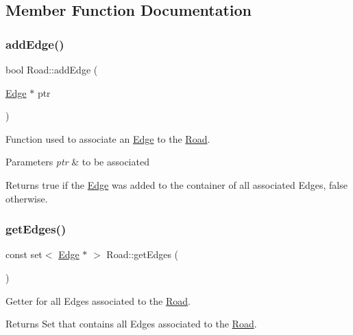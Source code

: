 \subsection{Member Function Documentation}
\hypertarget{class_road_a7a691f98e8bd53299ed2539de1e4d13c}{}\label{class_road_a7a691f98e8bd53299ed2539de1e4d13c} 
\subsubsection{\texorpdfstring{add\+Edge()}{addEdge()}}
{\footnotesize\ttfamily bool Road\+::add\+Edge (\begin{DoxyParamCaption}\item[{\hyperlink{class_edge}{Edge} $\ast$}]{ptr }\end{DoxyParamCaption})}

Function used to associate an \hyperlink{class_edge}{Edge} to the \hyperlink{class_road}{Road}.


\begin{DoxyParams}{Parameters}
{\em ptr} & to be associated\\
\hline
\end{DoxyParams}
\begin{DoxyReturn}{Returns}
true if the \hyperlink{class_edge}{Edge} was added to the container of all associated Edges, false otherwise. 
\end{DoxyReturn}
\hypertarget{class_road_a03fb1c0a74b860e4be6c951154add098}{}\label{class_road_a03fb1c0a74b860e4be6c951154add098} 
\subsubsection{\texorpdfstring{get\+Edges()}{getEdges()}}
{\footnotesize\ttfamily const set$<$ \hyperlink{class_edge}{Edge} $\ast$ $>$ Road\+::get\+Edges (\begin{DoxyParamCaption}{ }\end{DoxyParamCaption})}

Getter for all Edges associated to the \hyperlink{class_road}{Road}.

\begin{DoxyReturn}{Returns}
Set that contains all Edges associated to the \hyperlink{class_road}{Road}. 
\end{DoxyReturn}
\hypertarget{class_road_a4e0440c1d5bf11800f0df3c50dcb4b92}{}\label{class_road_a4e0440c1d5bf11800f0df3c50dcb4b92} 
